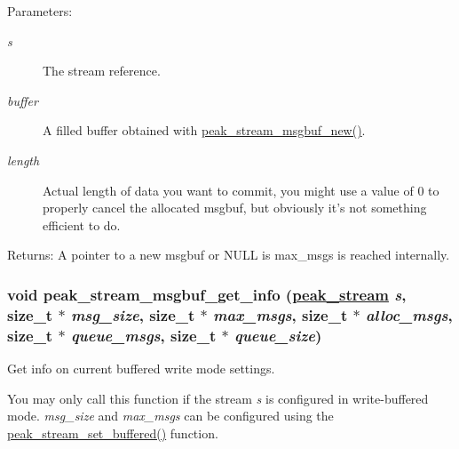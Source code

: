\begin{Desc}
\item[Parameters:]
\begin{description}
\item[{\em s}]The stream reference. \item[{\em buffer}]A filled buffer obtained with \hyperlink{group__stream__buf_ga57}{peak\_\-stream\_\-msgbuf\_\-new()}. \item[{\em length}]Actual length of data you want to commit, you might use a value of 0 to properly cancel the allocated msgbuf, but obviously it's not something efficient to do.\end{description}
\end{Desc}
\begin{Desc}
\item[Returns:]A pointer to a new msgbuf or NULL is max\_\-msgs is reached internally. \end{Desc}
\hypertarget{group__stream__buf_ga2}{
\subsubsection[peak\_\-stream\_\-msgbuf\_\-get\_\-info]{\setlength{\rightskip}{0pt plus 5cm}void peak\_\-stream\_\-msgbuf\_\-get\_\-info (\hyperlink{group__stream_ga0}{peak\_\-stream} {\em s}, size\_\-t $\ast$ {\em msg\_\-size}, size\_\-t $\ast$ {\em max\_\-msgs}, size\_\-t $\ast$ {\em alloc\_\-msgs}, size\_\-t $\ast$ {\em queue\_\-msgs}, size\_\-t $\ast$ {\em queue\_\-size})}}
\label{group__stream__buf_ga2}


Get info on current buffered write mode settings. 

You may only call this function if the stream {\em s\/} is configured in write-buffered mode. {\em msg\_\-size\/} and {\em max\_\-msgs\/} can be configured using the \hyperlink{group__stream__buf_ga54}{peak\_\-stream\_\-set\_\-buffered()} function.

